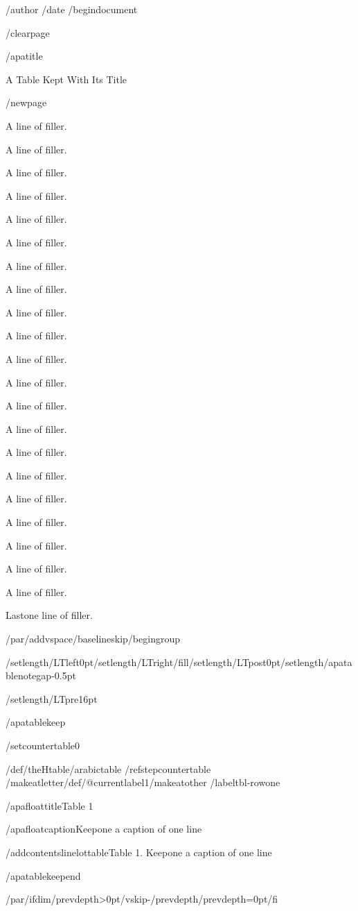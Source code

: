 /author{}
/date{}
/begin{document}


/clearpage

/apatitle{

A Table Kept With Its Title

}

/newpage{}

A line of filler.

A line of filler.

A line of filler.

A line of filler.

A line of filler.

A line of filler.

A line of filler.

A line of filler.

A line of filler.

A line of filler.

A line of filler.

A line of filler.

A line of filler.

A line of filler.

A line of filler.

A line of filler.

A line of filler.

A line of filler.

A line of filler.

A line of filler.

A line of filler.

Lastone line of filler.

/par/addvspace{/baselineskip}/begingroup

/setlength{/LTleft}{0pt}/setlength{/LTright}{/fill}/setlength{/LTpost}{0pt}/setlength{/apatablenotegap}{-0.5pt}

/setlength{/LTpre}{16pt}

/apatablekeep

/setcounter{table}{0}

/def/theHtable{/arabic{table}}%
/refstepcounter{table}%
/makeatletter/def/@currentlabel{1}/makeatother%
/label{tbl-rowone}

/apafloattitle{Table 1}

/apafloatcaption{Keepone a caption of one line}

/addcontentsline{lot}{table}{Table 1. Keepone a caption of one line}

/apatablekeepend

/par/ifdim/prevdepth>0pt/vskip-/prevdepth/prevdepth=0pt/fi

